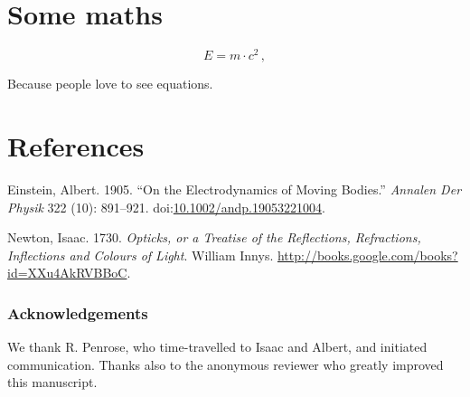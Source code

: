 \documentclass[a4paper,]{article}
\begin{document}
\section{Some maths}\label{some-maths}

\begin{equation} E = m\cdot c^2\,, \label{eq:emc2}\end{equation}

Because people love to see equations.

\section*{References}\label{references}

\hypertarget{refs}{}
\hypertarget{ref-Einstein1905}{}
Einstein, Albert. 1905. ``On the Electrodynamics of Moving Bodies.'' \emph{Annalen Der Physik} 322 (10): 891--921. doi:\href{https://doi.org/10.1002/andp.19053221004}{10.1002/andp.19053221004}.

\hypertarget{ref-Newton1730}{}
Newton, Isaac. 1730. \emph{Opticks, or a Treatise of the Reflections, Refractions, Inflections and Colours of Light}. William Innys. \url{http://books.google.com/books?id=XXu4AkRVBBoC}.

\subsubsection*{Acknowledgements}
{\small We thank R. Penrose, who time-travelled to Isaac and Albert, and initiated communication.
Thanks also to the anonymous reviewer who greatly improved this manuscript.}
\end{document}
